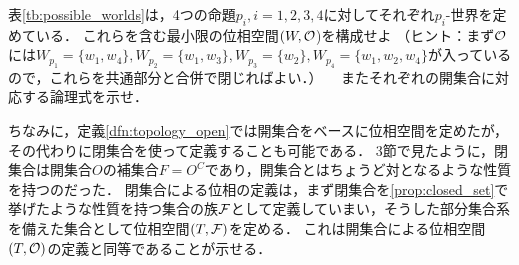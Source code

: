 \documentclass[11pt,a4paper, dvipdfmx]{jsarticle}
\begin{document}
\begin{renshu}{}{}
  表\ref{tb:possible_worlds}は，4つの命題$p_i, i = 1, 2, 3, 4$に対してそれぞれ$p_i$-世界を定めている．
  これらを含む最小限の位相空間$(W, \mathcal{O}$)を構成せよ
  （ヒント：まず$\mathcal{O}$には$W_{p_1} = \{w_1, w_4\}, W_{p_2} = \{w_1, w_3\}, W_{p_3} = \{w_2\}, W_{p_4} = \{w_1, w_2, w_4\}$が入っているので，これらを共通部分と合併で閉じればよい．）
　またそれぞれの開集合に対応する論理式を示せ．
\end{renshu}

ちなみに，定義\ref{dfn:topology_open}では開集合をベースに位相空間を定めたが，その代わりに閉集合を使って定義することも可能である．
3節で見たように，閉集合は開集合$O$の補集合$F = O^C$であり，開集合とはちょうど対となるような性質を持つのだった．
閉集合による位相の定義は，まず閉集合を\ref{prop:closed_set}で挙げたような性質を持つ集合の族$\mathcal{F}$として定義していまい，そうした部分集合系を備えた集合として位相空間$(T, \mathcal{F})$を定める．
これは開集合による位相空間$(T, \mathcal{O})$の定義と同等であることが示せる．




\end{document}

